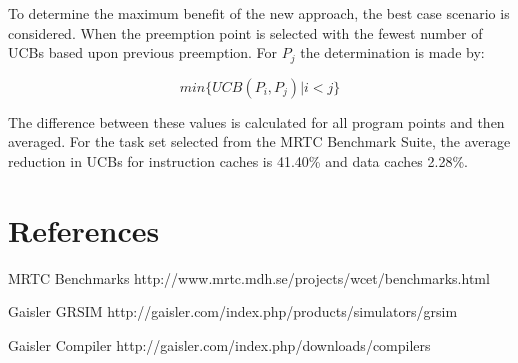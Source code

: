 \documentclass[12pt]{article}
\begin{document}
To determine the maximum benefit of the new approach, the best case
scenario is considered. When the preemption point is selected with the
fewest number of UCBs based upon previous preemption.  For ${P_j}$ the
determination is made by:

\begin{equation*}
  min\{ UCB(P_i, P_j) \vert i < j \}
\end{equation*}

The difference between these values is calculated for all program
points and then averaged. For the task set selected from the MRTC
Benchmark Suite, the average reduction in UCBs for instruction caches
is 41.40\% and data caches 2.28\%.

\section{References}

MRTC Benchmarks 
http://www.mrtc.mdh.se/projects/wcet/benchmarks.html


Gaisler GRSIM 
http://gaisler.com/index.php/products/simulators/grsim


Gaisler Compiler 
http://gaisler.com/index.php/downloads/compilers
\end{document}
